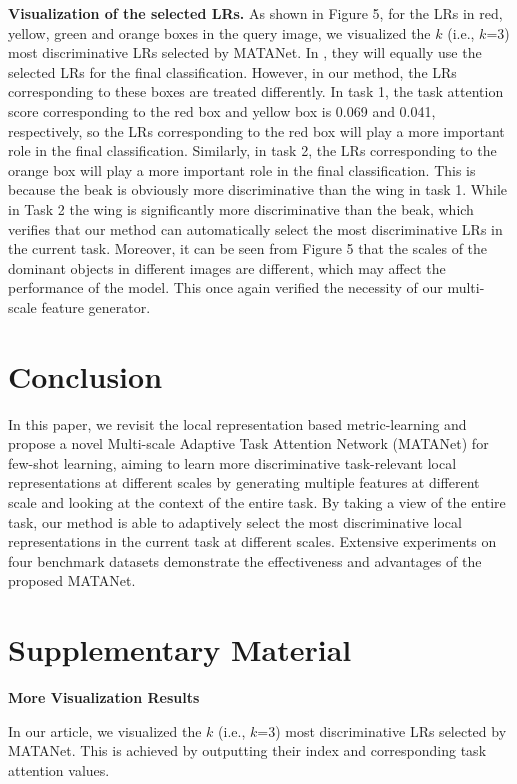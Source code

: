 \documentclass[final]{cvpr}
\begin{document}
	\textbf{Visualization of the selected LRs.} As shown in Figure 5, for the LRs in red, yellow, green and orange boxes in the query image, we visualized the $k$ (i.e., $k$=3) most discriminative LRs selected by MATANet. In \cite{li2019revisiting}, they will equally use the selected LRs for the final classification. 
	However, in our method, the LRs corresponding to these boxes are treated differently. In task 1, the task attention score corresponding to the red box and yellow box is 0.069 and 0.041, respectively, so the LRs corresponding to the red box will play a more important role in the final classification. Similarly,  in task 2, the LRs corresponding to the orange box will play a more important role in the final classification. This is because the beak is obviously more discriminative than the wing in task 1. While in Task 2 the wing is significantly more discriminative than the beak, which verifies that our method can automatically select the most discriminative LRs in the current task. Moreover, it can be seen from Figure 5 that the scales of the dominant objects in different images are different, which may affect the performance of the model. This once again verified the necessity of our multi-scale feature generator.
		
	\section{Conclusion}
	In this paper, we revisit the local representation based metric-learning and propose a novel Multi-scale Adaptive Task Attention Network (MATANet) for few-shot learning, aiming to learn more discriminative task-relevant local representations at different scales by generating multiple features at different scale and looking at the context of the entire task. 
	By taking a view of the entire task, our method is able to adaptively select the most discriminative local representations in the current task at different scales. 
	Extensive experiments on four benchmark datasets demonstrate the effectiveness and advantages of the proposed MATANet. 

	{\small
		
		
	}
	\clearpage
\section*{Supplementary Material }

\noindent
\textbf{More Visualization Results}

In our article, we visualized the $k$ (i.e., $k$=3) most discriminative LRs selected by MATANet. This is achieved by outputting their index and corresponding task attention values. 
\end{document}
